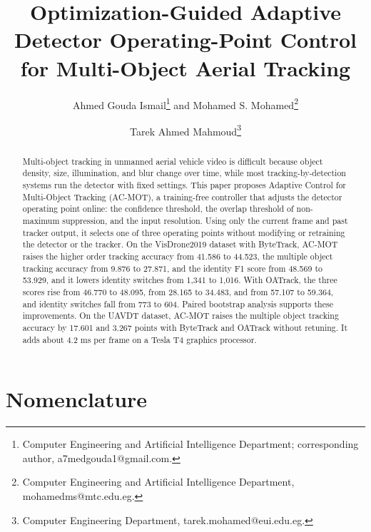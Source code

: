 \documentclass[journal]{new-aiaa}
\title{Optimization-Guided Adaptive Detector Operating-Point Control for Multi-Object Aerial Tracking}
\author{Ahmed Gouda Ismail\footnote{Computer Engineering and Artificial Intelligence Department; corresponding author, a7medgouda1@gmail.com.} and Mohamed S. Mohamed\footnote{Computer Engineering and Artificial Intelligence Department, mohamedms@mtc.edu.eg.}}
\affil{Military Technical College, Cairo, Egypt}
\author{Tarek Ahmed Mahmoud\footnote{Computer Engineering Department, tarek.mohamed@eui.edu.eg.}}
\affil{Egypt University of Informatics, Cairo, Egypt}
\begin{document}
\maketitle

\begin{abstract}
Multi-object tracking in unmanned aerial vehicle video is difficult because object density, size, illumination, and blur change over time, while most tracking-by-detection systems run the detector with fixed settings. This paper proposes Adaptive Control for Multi-Object Tracking (AC-MOT), a training-free controller that adjusts the detector operating point online: the confidence threshold, the overlap threshold of non-maximum suppression, and the input resolution. Using only the current frame and past tracker output, it selects one of three operating points without modifying or retraining the detector or the tracker. On the VisDrone2019 dataset with ByteTrack, AC-MOT raises the higher order tracking accuracy from 41.586 to 44.523, the multiple object tracking accuracy from 9.876 to 27.871, and the identity F1 score from 48.569 to 53.929, and it lowers identity switches from 1,341 to 1,016. With OATrack, the three scores rise from 46.770 to 48.095, from 28.165 to 34.483, and from 57.107 to 59.364, and identity switches fall from 773 to 604. Paired bootstrap analysis supports these improvements. On the UAVDT dataset, AC-MOT raises the multiple object tracking accuracy by 17.601 and 3.267 points with ByteTrack and OATrack without retuning. It adds about 4.2 ms per frame on a Tesla T4 graphics processor.
\end{abstract}

\section*{Nomenclature}
\end{document}
